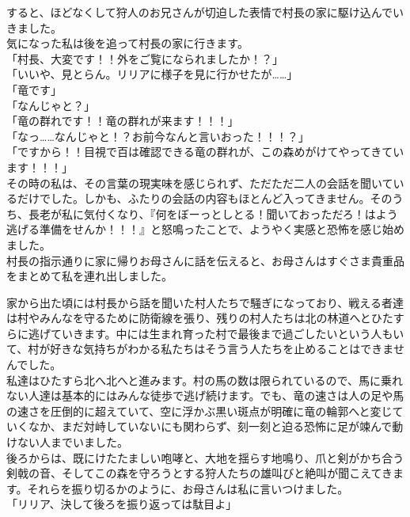 \documentclass[oneside, a4paper]{jsbook}
\begin{document}
すると、ほどなくして狩人のお兄さんが切迫した表情で村長の家に駆け込んでいきました。\\
気になった私は後を追って村長の家に行きます。\\

\noindent
「村長、大変です！！外をご覧になられましたか！？」\\
「いいや、見とらん。リリアに様子を見に行かせたが……」\\
「竜です」\\
「なんじゃと？」\\
「竜の群れです！！竜の群れが来ます！！！」\\
「なっ……なんじゃと！？お前今なんと言いおった！！！？」\\
「ですから！！目視で百は確認できる竜の群れが、この森めがけてやってきています！！！」\\

その時の私は、その言葉の現実味を感じられず、ただただ二人の会話を聞いているだけでした。しかも、ふたりの会話の内容もほとんど入ってきません。そのうち、長老が私に気付くなり、『何をぼーっとしとる！聞いておっただろ！はよう逃げる準備をせんか！！！』と怒鳴ったことで、ようやく実感と恐怖を感じ始めました。\\

村長の指示通りに家に帰りお母さんに話を伝えると、お母さんはすぐさま貴重品をまとめて私を連れ出しました。

家から出た頃には村長から話を聞いた村人たちで騒ぎになっており、戦える者達は村やみんなを守るために防衛線を張り、残りの村人たちは北の林道へとひたすらに逃げていきます。中には生まれ育った村で最後まで過ごしたいという人もいて、村が好きな気持ちがわかる私たちはそう言う人たちを止めることはできませんでした。\\

私達はひたすら北へ北へと進みます。村の馬の数は限られているので、馬に乗れない人達は基本的にはみんな徒歩で逃げ続けます。でも、竜の速さは人の足や馬の速さを圧倒的に超えていて、空に浮かぶ黒い斑点が明確に竜の輪郭へと変じていくなか、まだ対峙していないにも関わらず、刻一刻と迫る恐怖に足が竦んで動けない人までいました。\\

後ろからは、既にけたたましい咆哮と、大地を揺らす地鳴り、爪と剣がかち合う剣戟の音、そしてこの森を守ろうとする狩人たちの雄叫びと絶叫が聞こえてきます。それらを振り切るかのように、お母さんは私に言いつけました。\\

\noindent
「リリア、決して後ろを振り返っては駄目よ」\\
\end{document}

